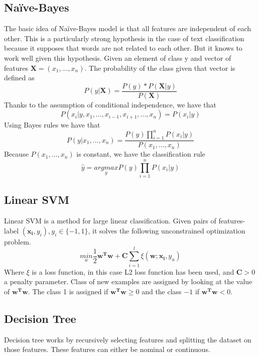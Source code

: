 \subsection{Na\"{i}ve-Bayes\cite{zhang_optimality_nodate}}
The basic idea of Na\"{i}ve-Bayes model is that all features are independent of each other. This is a particularly strong hypothesis in the case of text classification because it supposes that words are not related to each other. But it knows to work well given this hypothesis. 
Given an element of class y and vector of features $\mathbf{X} = (x_1,...,x_n)$. The probability of the class given that vector is defined as 
\begin{equation}
 P(y | \mathbf{X}) = \frac{P(y)*P(\mathbf{X} | y)}{P(\mathbf{X})}
\end{equation}
Thanks to the assumption of conditional independence, we have that 
\begin{equation}
 P(x_i |y,x_1, ...,x_{i-1},x_{i+1},...,x_n) = P(x_i | y)
\end{equation}
Using Bayes rules we have that
\begin{equation}
 P(y|x_1,...,x_n) = \frac{P(y)\prod_{i=1}^n P(x_i | y)}{P(x_1,...,x_n)}
\end{equation}
Because $P(x_1,...,x_n)$ is constant, we have the classification rule 
\begin{equation}
 \hat{y} = \underset{y}{argmax} P(y)\prod_{i=1}^n P(x_i | y)
\end{equation}
\subsection{Linear SVM}
Linear SVM is a method for large linear classification. Given pairs of features-label $(\mathbf{x_i}, y_i), y_i \in \{-1, 1\}$, it solves the following unconstrained optimization problem. 
\begin{equation}
 \underset{w}{min} \frac{1}{2} \mathbf{w^Tw} + \mathbf{C} \sum_{i=1}^l \xi(\mathbf{w;x_i},y_u)
\end{equation}
Where $\xi$ is a loss function, in this case L2 loss function has been used, and $\mathbf{C} > 0$ a penalty parameter. 
Class of new examples are assigned by looking at the value of $\mathbf{w^Tw}$. The class 1 is assigned if $\mathbf{w^Tw} \geq 0$ and the class $-1$ if $\mathbf{w^Tw} < 0$.
\subsection{Decision Tree\cite{Rokach:2014:DMD:2755359}}
Decision tree works by recursively selecting features and splitting the dataset on those features. These features can either be nominal or continuous. \\

